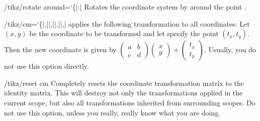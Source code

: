 \begin{key}{/tikz/rotate around={\ttfamily\char`\{}|:|}
  Rotates the coordinate system by  around the point
  .
\begin{codeexample}[]
\end{codeexample}
\end{key}


\begin{key}{/tikz/cm={\ttfamily\char`\{}|,||,||,||,|}
  applies the following transformation to all coordinates: Let $(x,y)$
  be the coordinate to be transformed and let 
  specify the point $(t_x,t_y)$. Then the new coordinate is given by
  $\left(\begin{smallmatrix} a & b \\ c & d\end{smallmatrix}\right)
  \left(\begin{smallmatrix} x \\ y \end{smallmatrix}\right) +
  \left(\begin{smallmatrix} t_x \\ t_y
  \end{smallmatrix}\right)$. Usually, you do not use this option
  directly. 
\begin{codeexample}[]
\end{codeexample}
\end{key}

\begin{key}{/tikz/reset cm}
  Completely resets the coordinate transformation matrix to the
  identity matrix. This will destroy not only the transformations
  applied in the current scope, but also all transformations inherited
  from surrounding scopes. Do not use this option, unless you really,
  really know what you are doing.
\end{key}



